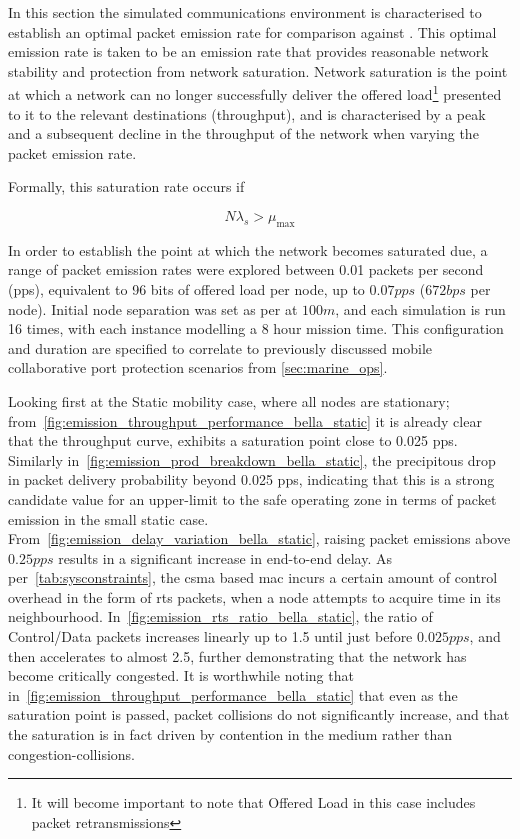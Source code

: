 In this section the simulated communications environment is characterised to establish an optimal packet emission rate for comparison against \cite{Guo11}.
This optimal emission rate is taken to be an emission rate that provides reasonable network stability and protection from network saturation.
Network saturation is the point at which a network can no longer successfully deliver the offered load\footnote{It will become important to note that Offered Load in this case includes packet retransmissions} presented to it to the relevant destinations (throughput), and is characterised by a peak and a subsequent decline in the throughput of the network when varying the packet emission rate. 

Formally, this saturation rate occurs if

\begin{equation}
N\lambda_s>\mu_\text{max}
\end{equation}


In order to establish the point at which the network becomes saturated due, a range of packet emission rates were explored between 0.01 packets per second (pps), equivalent to 96 bits of offered load per node, up to $0.07 pps$ ($672 bps$ per node).
Initial node separation was set as per \citet{Guo11} at $100m$, and each simulation is run 16 times, with each instance modelling a 8 hour mission time.
This configuration and duration are specified to correlate to previously discussed mobile collaborative port protection scenarios from \autoref{sec:marine_ops}.

Looking first at the Static mobility case, where all nodes are stationary; from~\autoref{fig:emission_throughput_performance_bella_static} it is already clear that the throughput curve, exhibits a saturation point close to 0.025 pps.
Similarly in~\autoref{fig:emission_prod_breakdown_bella_static}, the precipitous drop in packet delivery probability beyond 0.025 pps, indicating that this is a strong candidate value for an upper-limit to the safe operating zone in terms of packet emission in the small static case.
From~\autoref{fig:emission_delay_variation_bella_static}, raising packet emissions above $0.25pps$ results in a significant increase in end-to-end delay.
As per~\autoref{tab:sysconstraints}, the \gls{csma} based \gls{mac} incurs a certain amount of control overhead in the form of \gls{rts} packets, when a node attempts to acquire time in its neighbourhood.
In~\autoref{fig:emission_rts_ratio_bella_static}, the ratio of Control/Data packets increases linearly up to 1.5 until just before $0.025pps$, and then accelerates to almost 2.5, further demonstrating that the network has become critically congested.
It is worthwhile noting that in~\autoref{fig:emission_throughput_performance_bella_static} that even as the saturation point is passed, packet collisions do not significantly increase, and that the saturation is in fact driven by contention in the medium rather than congestion-collisions.

